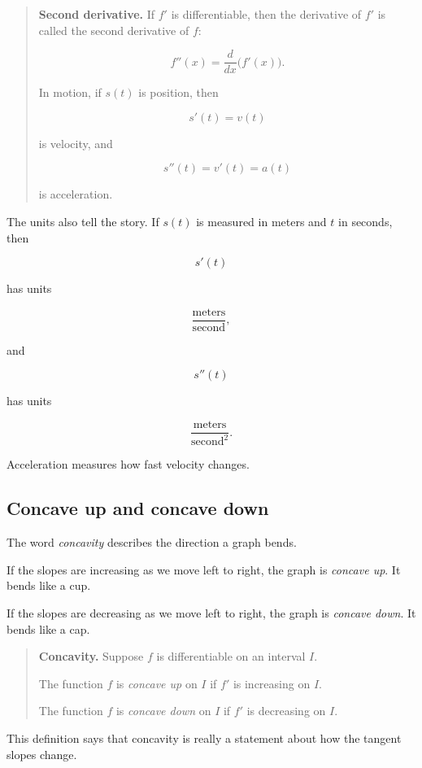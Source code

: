 \begin{quote}
\textbf{Second derivative.}
If \(f'\) is differentiable, then the derivative of \(f'\) is called the second derivative
of \(f\):

\[
\boxed{
f''(x)=\frac{d}{dx}\bigl(f'(x)\bigr).
}
\]

In motion, if \(s(t)\) is position, then

\[
s'(t)=v(t)
\]

is velocity, and

\[
s''(t)=v'(t)=a(t)
\]

is acceleration.
\end{quote}

The units also tell the story.  If \(s(t)\) is measured in meters and \(t\) in seconds,
then

\[
s'(t)
\]

has units

\[
\frac{\text{meters}}{\text{second}},
\]

and

\[
s''(t)
\]

has units

\[
\frac{\text{meters}}{\text{second}^2}.
\]

Acceleration measures how fast velocity changes.

\subsection{Concave up and concave down}
\label{subsec:concave-up-down}

The word \emph{concavity} describes the direction a graph bends.

If the slopes are increasing as we move left to right, the graph is \emph{concave up}.
It bends like a cup.

If the slopes are decreasing as we move left to right, the graph is \emph{concave down}.
It bends like a cap.

\begin{quote}
\textbf{Concavity.}
Suppose \(f\) is differentiable on an interval \(I\).

The function \(f\) is \emph{concave up} on \(I\) if \(f'\) is increasing on \(I\).

The function \(f\) is \emph{concave down} on \(I\) if \(f'\) is decreasing on \(I\).
\end{quote}

This definition says that concavity is really a statement about how the tangent slopes
change.

